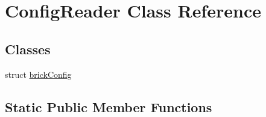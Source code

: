 \hypertarget{class_config_reader}{\section{Config\+Reader Class Reference}
\label{class_config_reader}
}
\subsection*{Classes}
\begin{DoxyCompactItemize}
\item 
struct \hyperlink{struct_config_reader_1_1brick_config}{brick\+Config}
\end{DoxyCompactItemize}
\subsection*{Static Public Member Functions}
